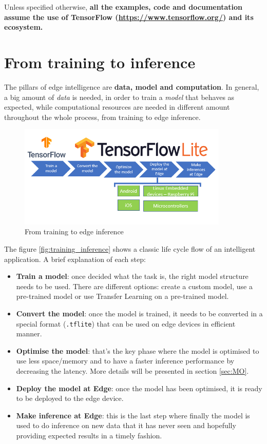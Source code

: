 Unless specified otherwise, \textbf{all the examples, code and documentation
assume the use of TensorFlow (\url{https://www.tensorflow.org/}) and its
ecosystem.}

\section{From training to inference}\label{sec:training}

The pillars of edge intelligence are \textbf{data, model and computation}.
In general, a big amount of \textit{data} is needed, in order to train a
\textit{model} that behaves as expected, while computational resources are
needed in different amount throughout the whole process, from training to edge
inference.

\begin{figure}[ht]
    \includegraphics[width=10cm]{images/introduction/training_inference_flow.png}
    \centering
    \caption{From training to edge inference}\label{fig:training_inference}
\end{figure}

The figure \autoref{fig:training_inference} shows a classic life cycle flow of
an intelligent application. A brief explanation of each step:

\begin{itemize}
    \item \textbf{Train a model}: once decided what the task is, the right
        model structure needs to be used. There are different options: create a
        custom model, use a pre-trained model or use Transfer Learning on a
        pre-trained model.
    \item \textbf{Convert the model}: once the model is trained, it needs to be
        converted in a special format (\texttt{.tflite}) that can be used on
        edge devices in efficient manner.
    \item \textbf{Optimise the model}: that's the key phase where the model is
        optimised to use less space/memory and to have a faster inference
        performance by decreasing the latency. More details will be presented
        in section \autoref{sec:MO}.
    \item \textbf{Deploy the model at Edge}: once the model has been optimised,
        it is ready to be deployed to the edge device.
    \item \textbf{Make inference at Edge}: this is the last step where finally
        the model is used to do inference on new data that it has never seen
        and hopefully providing expected results in a timely fashion.
\end{itemize}

